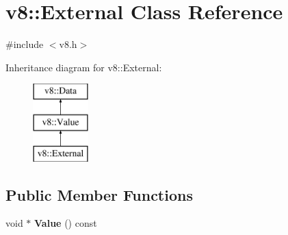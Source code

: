 \hypertarget{classv8_1_1_external}{}\section{v8\+:\+:External Class Reference}
\label{classv8_1_1_external}


{\ttfamily \#include $<$v8.\+h$>$}

Inheritance diagram for v8\+:\+:External\+:\begin{figure}[H]
\begin{center}
\leavevmode
\includegraphics[height=3.000000cm]{classv8_1_1_external}
\end{center}
\end{figure}
\subsection*{Public Member Functions}
\begin{DoxyCompactItemize}
\item 
\hypertarget{classv8_1_1_external_ac2733ee14b5b26f369e5a335c0fe3301}{}void $\ast$ {\bfseries Value} () const \label{classv8_1_1_external_ac2733ee14b5b26f369e5a335c0fe3301}

\end{DoxyCompactItemize}
